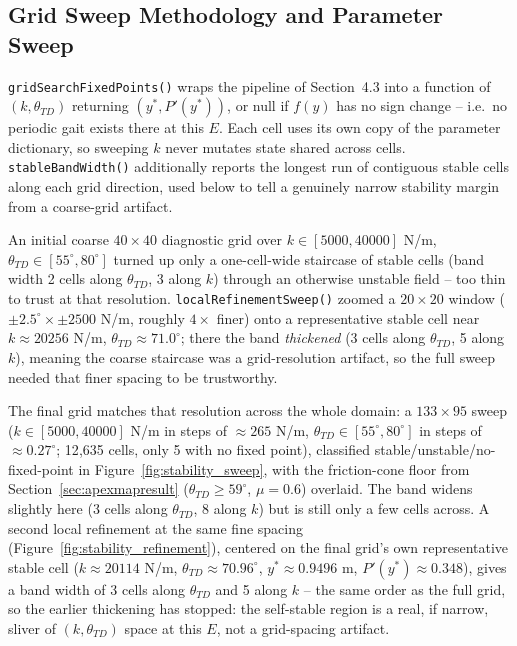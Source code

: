 \documentclass[11pt]{article}
\begin{document}
\subsection{Grid Sweep Methodology and Parameter Sweep}
\texttt{gridSearchFixedPoints()} wraps the pipeline of Section~4.3
into a function of $(k,\theta_{TD})$ returning $(y^\ast,P'(y^\ast))$,
or null if $f(y)$ has no sign change -- i.e.\ no periodic gait exists
there at this $E$. Each cell uses its own copy of the parameter
dictionary, so sweeping $k$ never mutates state shared across cells.
\texttt{stableBandWidth()} additionally reports the longest run of
contiguous stable cells along each grid direction, used below to tell
a genuinely narrow stability margin from a coarse-grid artifact.

An initial coarse $40\times40$ diagnostic grid over
$k\in[5000,40000]$ N/m, $\theta_{TD}\in[55^\circ,80^\circ]$ turned up
only a one-cell-wide staircase of stable cells (band width 2 cells
along $\theta_{TD}$, 3 along $k$) through an otherwise unstable field
-- too thin to trust at that resolution. \texttt{localRefinementSweep()}
zoomed a $20\times20$ window ($\pm2.5^\circ\times\pm2500$ N/m, roughly
$4\times$ finer) onto a representative stable cell near
$k\approx20256$ N/m, $\theta_{TD}\approx71.0^\circ$; there the band
\emph{thickened} (3 cells along $\theta_{TD}$, 5 along $k$), meaning
the coarse staircase was a grid-resolution artifact, so the full
sweep needed that finer spacing to be trustworthy.

The final grid matches that resolution across the whole domain: a
$133\times95$ sweep ($k\in[5000,40000]$ N/m in steps of
$\approx265$ N/m, $\theta_{TD}\in[55^\circ,80^\circ]$ in steps of
$\approx0.27^\circ$; 12{,}635 cells, only 5 with no fixed point),
classified stable/unstable/no-fixed-point in
Figure~\ref{fig:stability_sweep}, with the friction-cone floor from
Section~\ref{sec:apexmapresult} ($\theta_{TD}\ge59^\circ$, $\mu=0.6$)
overlaid. The band widens slightly here (3 cells along $\theta_{TD}$,
8 along $k$) but is still only a few cells across. A second local
refinement at the same fine spacing (Figure~\ref{fig:stability_refinement}),
centered on the final grid's own representative stable cell
($k\approx20114$ N/m, $\theta_{TD}\approx70.96^\circ$,
$y^\ast\approx0.9496$ m, $P'(y^\ast)\approx0.348$), gives a band width
of 3 cells along $\theta_{TD}$ and 5 along $k$ -- the same order as
the full grid, so the earlier thickening has stopped: the self-stable
region is a real, if narrow, sliver of $(k,\theta_{TD})$ space at this
$E$, not a grid-spacing artifact.
\end{document}

